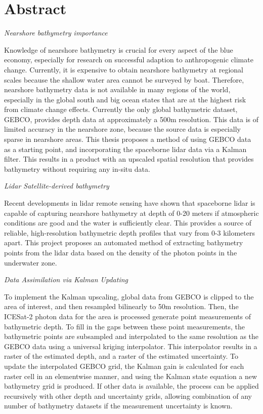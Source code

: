 \chapter*{Abstract}
\noindent\emph{Nearshore bathymetry importance}

Knowledge of nearshore bathymetry is crucial for every aspect of the blue economy, especially for research on successful adaption to anthropogenic climate change. Currently, it is expensive to obtain nearshore bathymetry at regional scales because the shallow water area cannot be surveyed by boat. Therefore, nearshore bathymetry data is not available in many regions of the world, especially in the global south and big ocean states that are at the highest risk from climate change effects. Currently the only global bathymetric dataset, GEBCO, provides depth data at approximately a 500m resolution. This data is of limited accuracy in the nearshore zone, because the source data is especially sparse in nearshore areas. This thesis proposes a method of using GEBCO data as a starting point, and incorporating the spaceborne lidar data via a Kalman filter. This results in a product with an upscaled spatial resolution that provides bathymetry without requiring any in-situ data.

\noindent\emph{Lidar Satellite-derived bathymetry}

Recent developments in lidar remote sensing have shown that spaceborne lidar is capable of capturing nearshore bathymetry at depth of 0-20 meters if atmospheric conditions are good and the water is sufficiently clear. This provides a source of reliable, high-resolution bathymetric depth profiles that vary from 0-3 kilometers apart. This project proposes an automated method of extracting bathymetry points from the lidar data based on the density of the photon points in the underwater zone.

\noindent\emph{Data Assimilation via Kalman Updating}

To implement the Kalman upscaling, global data from GEBCO is clipped to the area of interest, and then resampled bilinearly to 50m resolution. Then, the ICESat-2 photon data for the area is processed generate point measurements of bathymetric depth. To fill in the gaps between these point measurements, the bathymetric points are subsampled and interpolated to the same resolution as the GEBCO data using a universal kriging interpolator. This interpolator results in a raster of the estimated depth, and a raster of the estimated uncertainty. To update the interpolated GEBCO grid, the Kalman gain is calculated for each raster cell in an elementwise manner, and using the Kalman state equation a new bathymetry grid is produced. If other data is available, the process can be applied recursively with other depth and uncertainty grids, allowing combination of any number of bathymetry datasets if the measurement uncertainty is known. 

